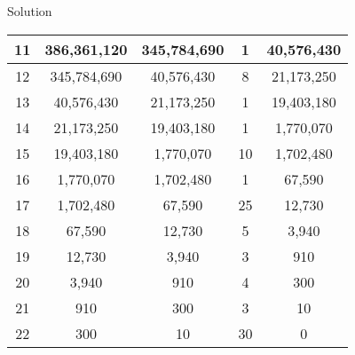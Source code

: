 \begin{vworkexampleparsection}{Solution}
\begin{table}
\begin{center}
\begin{tabular}{|c|c|c|c|c|}
\hline
\small{11}    & \small{386,361,120}       & \small{345,784,690}       & \small{1}       & \small{40,576,430}        \\
\hline
\small{12}    & \small{345,784,690}       & \small{40,576,430}        & \small{8}       & \small{21,173,250}        \\
\hline
\small{13}    & \small{40,576,430}       & \small{21,173,250}         & \small{1}       & \small{19,403,180}        \\
\hline
\small{14}    & \small{21,173,250}       & \small{19,403,180}         & \small{1}       & \small{1,770,070}         \\
\hline
\small{15}    & \small{19,403,180}       & \small{1,770,070}          & \small{10}      & \small{1,702,480}         \\
\hline
\small{16}    & \small{1,770,070}        & \small{1,702,480}          & \small{1}       & \small{67,590}            \\
\hline
\small{17}    & \small{1,702,480}        & \small{67,590}             & \small{25}      & \small{12,730}            \\
\hline
\small{18}    & \small{67,590}           & \small{12,730}             & \small{5}       & \small{3,940}             \\
\hline
\small{19}    & \small{12,730}           & \small{3,940}              & \small{3}       & \small{910}               \\
\hline
\small{20}    & \small{3,940}            & \small{910}                & \small{4}       & \small{300}               \\
\hline
\small{21}    & \small{910}              & \small{300}                & \small{3}       & \small{10}                \\
\hline
\small{22}    & \small{300}              & \small{10}                 & \small{30}      & \small{0}                 \\
\hline
\end{tabular}
\end{center}
\end{table}


\end{vworkexampleparsection}
